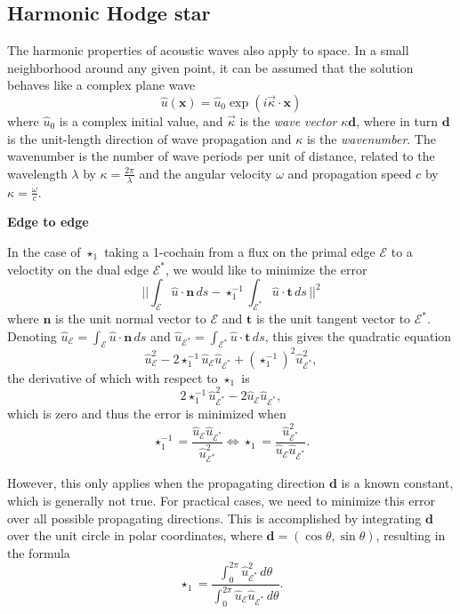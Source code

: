 \documentclass[utf8,english]{gradu3}
\begin{document}
\subsection{Harmonic Hodge star}\label{sec:harmonic_hodge}

The harmonic properties of acoustic waves also apply to space.
In a small neighborhood around any given point,
it can be assumed that the solution behaves like a complex plane wave
\begin{equation}\label{eq:plane_wave}
  \hat{u}(\mathbf{x}) = \hat{u}_0 \exp(i\vec{\kappa} \cdot \mathbf{x})
\end{equation}
where $\hat{u}_0$ is a complex initial value,
and $\vec{\kappa}$ is the \textit{wave vector} $\kappa \mathbf{d}$,
where in turn $\mathbf{d}$ is the unit-length direction of wave propagation
and $\kappa$ is the \textit{wavenumber}.
The wavenumber is the number of wave periods per unit of distance,
related to the wavelength $\lambda$ by $\kappa = \frac{2\pi}{\lambda}$
and the angular velocity $\omega$ and propagation speed $c$ by
$\kappa = \frac{\omega}{c}$.

\textbf{Edge to edge}

In the case of $\star_1$ taking a 1-cochain from a flux on the primal edge $\mathcal{E}$
to a veloctity on the dual edge $\mathcal{E}^*$,
we would like to minimize the error
\begin{equation}\label{eq:harmonic_error_norm}
  ||\int_{\mathcal{E}} \hat{u} \cdot \mathbf{n} \,ds
  - \star_1^{-1} \int_{\mathcal{E}^*} \hat{u} \cdot \mathbf{t} \,ds\,||^2
\end{equation}
where $\mathbf{n}$ is the unit normal vector to $\mathcal{E}$
and $\mathbf{t}$ is the unit tangent vector to $\mathcal{E}^*$.
Denoting $\hat{u}_{\mathcal{E}} = \int_{\mathcal{E}} \hat{u} \cdot \mathbf{n} \,ds$
and $\hat{u}_{\mathcal{E}^*} = \int_{\mathcal{E}^*} \hat{u} \cdot \mathbf{t} \,ds$,
this gives the quadratic equation
\[
\hat{u}_{\mathcal{E}}^2
- 2 \star_1^{-1} \hat{u}_{\mathcal{E}} \hat{u}_{\mathcal{E}^*}
+ (\star_1^{-1})^2 \hat{u}_{\mathcal{E}^*}^2,
\]
the derivative of which with respect to $\star_1$ is
\[
  2 \star_1^{-1} \hat{u}_{\mathcal{E}^*}^2 - 2 \hat{u}_{\mathcal{E}} \hat{u}_{\mathcal{E}^*},
\]
which is zero and thus the error is minimized when
\[
  \star_1^{-1} = \frac{\hat{u}_{\mathcal{E}} \hat{u}_{\mathcal{E}^*}}{\hat{u}_{\mathcal{E}^*}^2}
  \iff \star_1 = \frac{\hat{u}_{\mathcal{E}^*}^2}{\hat{u}_{\mathcal{E}} \hat{u}_{\mathcal{E}^*}}.
\]

However, this only applies when the propagating direction $\mathbf{d}$
is a known constant, which is generally not true.
For practical cases, we need to minimize this error
over all possible propagating directions.
This is accomplished by integrating $\mathbf{d}$ over the unit circle
in polar coordinates, where $\mathbf{d} = (\cos\theta, \sin\theta)$,
resulting in the formula
\begin{equation}\label{eq:star_1_integral}
  \star_1 = \frac{\int_{0}^{2\pi} \hat{u}_{\mathcal{E}^*}^2 \,d\theta}
  {\int_{0}^{2\pi} \hat{u}_{\mathcal{E}} \hat{u}_{\mathcal{E}^*} \,d\theta}.
\end{equation}
\end{document}
